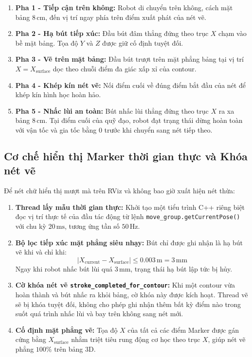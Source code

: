 \documentclass[a4paper,12pt]{article}
\begin{document}
\begin{enumerate}
    \item \textbf{Pha 1 - Tiếp cận trên không:} Robot di chuyển trên không, cách mặt bảng $8\,\text{cm}$, đến vị trí ngay phía trên điểm xuất phát của nét vẽ.
    \item \textbf{Pha 2 - Hạ bút tiếp xúc:} Đầu bút đâm thẳng đứng theo trục $X$ chạm vào bề mặt bảng. Tọa độ $Y$ và $Z$ được giữ cố định tuyệt đối.
    \item \textbf{Pha 3 - Vẽ trên mặt bảng:} Đầu bút trượt trên mặt phẳng bảng tại vị trí $X = X_{\text{surface}}$ dọc theo chuỗi điểm đa giác xấp xỉ của contour.
    \item \textbf{Pha 4 - Khép kín nét vẽ:} Nối điểm cuối về đúng điểm bắt đầu của nét để khép kín hình học hoàn hảo.
    \item \textbf{Pha 5 - Nhấc lùi an toàn:} Bút nhấc lùi thẳng đứng theo trục $X$ ra xa bảng $8\,\text{cm}$. Tại điểm cuối của quỹ đạo, robot đạt trạng thái dừng hoàn toàn với vận tốc và gia tốc bằng 0 trước khi chuyển sang nét tiếp theo.
\end{enumerate}

\subsection{Cơ chế hiển thị Marker thời gian thực và Khóa nét vẽ}
Để nét chữ hiển thị mượt mà trên RViz và không bao giờ xuất hiện nét thừa:
\begin{enumerate}
    \item \textbf{Thread lấy mẫu thời gian thực:} Khởi tạo một tiểu trình C++ riêng biệt đọc vị trí thực tế của đầu tác động từ lệnh \texttt{move\_group.getCurrentPose()} với chu kỳ $20\,\text{ms}$, tương ứng tần số $50\,\text{Hz}$.
    \item \textbf{Bộ lọc tiếp xúc mặt phẳng siêu nhạy:} Bút chỉ được ghi nhận là hạ bút vẽ khi và chỉ khi:
    \begin{equation}
    |X_{\text{current}} - X_{\text{surface}}| \le 0.003\,\text{m} = 3\,\text{mm}
    \end{equation}
    Ngay khi robot nhấc bút lùi quá $3\,\text{mm}$, trạng thái hạ bút lập tức bị hủy.
    \item \textbf{Cờ khóa nét vẽ \texttt{stroke\_completed\_for\_contour}:} Khi một contour vừa hoàn thành và bút nhấc ra khỏi bảng, cờ khóa này được kích hoạt. Thread vẽ sẽ bị khóa tuyệt đối, không cho phép ghi nhận thêm bất kỳ điểm nào trong suốt quá trình nhấc lùi và bay trên không sang nét mới.
    \item \textbf{Cố định mặt phẳng vẽ:} Tọa độ $X$ của tất cả các điểm Marker được gán cứng bằng $X_{\text{surface}}$ nhằm triệt tiêu rung động cơ học theo trục $X$, giúp nét vẽ phẳng $100\%$ trên bảng 3D.
\end{enumerate}
\end{document}
